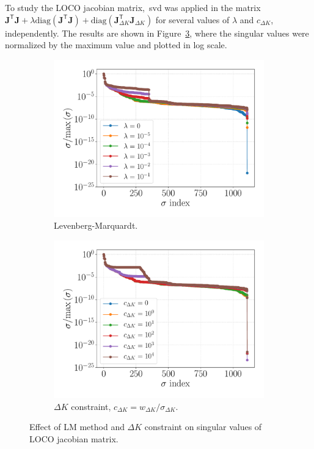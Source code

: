 To study the LOCO jacobian matrix,~\gls{svd} was applied in the matrix $\mathbf{J}^{\mathsf{T}}\mathbf{J} + \lambda \mathrm{diag}\left(\mathbf{J}^{\mathsf{T}}\mathbf{J}\right) + \mathrm{diag}\left(\mathbf{J}^{\mathsf{T}}_{\Delta K}\mathbf{J}_{\Delta K}\right)$ for several values of $\lambda$ and ${c}_{\Delta K}$, independently. The results are shown in Figure~\ref{fig:singval}, where the singular values were normalized by the maximum value and plotted in log scale.
\begin{figure}
\centering
\begin{subfigure}[t]{0.49\textwidth}
\includegraphics[width=1.0\textwidth]{figures/lm_singular_values_big_new.pdf}
    \caption{Levenberg-Marquardt.}
    \label{subfig:lm}
\end{subfigure}
 \begin{subfigure}[t]{0.49\textwidth}
\includegraphics[width=1.0\textwidth]{figures/constraint_singular_values_big_new.pdf}
    \caption{$\Delta K$ constraint, $c_{\Delta K} = w_{\Delta K}/\sigma_{\Delta K}$.}
    \label{subfig:constraint}
\end{subfigure}
\caption{Effect of LM method and $\Delta K$ constraint on singular values of LOCO jacobian matrix.}
\label{fig:singval}
\end{figure}

